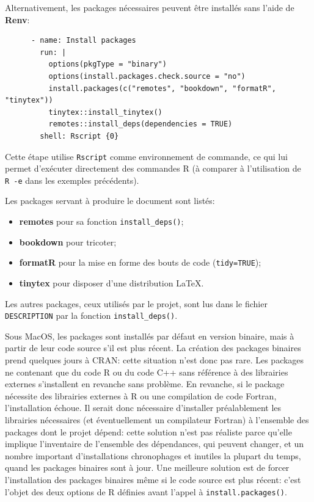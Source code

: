 \documentclass[
  12pt,
  french,
  a4paper,
  extrafontsizes,onecolumn,openright
  ]{memoir}
\providecommand{\tightlist}{%
  \setlength{\itemsep}{0pt}\setlength{\parskip}{0pt}}
\begin{document}
Alternativement, les packages nécessaires peuvent être installés sans l'aide de \textbf{Renv}:

\begin{verbatim}
      - name: Install packages
        run: |
          options(pkgType = "binary")
          options(install.packages.check.source = "no")
          install.packages(c("remotes", "bookdown", "formatR", "tinytex"))
          tinytex::install_tinytex()
          remotes::install_deps(dependencies = TRUE)
        shell: Rscript {0}
\end{verbatim}

Cette étape utilise \texttt{Rscript} comme environnement de commande, ce qui lui permet d'exécuter directement des commandes R (à comparer à l'utilisation de \texttt{R\ -e} dans les exemples précédents).

Les packages servant à produire le document sont listés:

\begin{itemize}
\tightlist
\item
  \textbf{remotes} pour sa fonction \texttt{install\_deps()};
\item
  \textbf{bookdown} pour tricoter;
\item
  \textbf{formatR} pour la mise en forme des bouts de code (\texttt{tidy=TRUE});
\item
  \textbf{tinytex} pour disposer d'une distribution LaTeX.
\end{itemize}

Les autres packages, ceux utilisés par le projet, sont lus dans le fichier \texttt{DESCRIPTION} par la fonction \texttt{install\_deps()}.

Sous MacOS, les packages sont installés par défaut en version binaire, mais à partir de leur code source s'il est plus récent.
La création des packages binaires prend quelques jours à CRAN: cette situation n'est donc pas rare.
Les packages ne contenant que du code R ou du code C++ sans référence à des librairies externes s'installent en revanche sans problème.
En revanche, si le package nécessite des librairies externes à R ou une compilation de code Fortran, l'installation échoue.
Il serait donc nécessaire d'installer préalablement les librairies nécessaires (et éventuellement un compilateur Fortran) à l'ensemble des packages dont le projet dépend: cette solution n'est pas réaliste parce qu'elle implique l'inventaire de l'ensemble des dépendances, qui peuvent changer, et un nombre important d'installations chronophages et inutiles la plupart du temps, quand les packages binaires sont à jour.
Une meilleure solution est de forcer l'installation des packages binaires même si le code source est plus récent: c'est l'objet des deux options de R définies avant l'appel à \texttt{install.packages()}.
\end{document}

